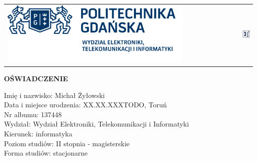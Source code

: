 \documentclass[10pt,a4paper,titlepage,twoside]{report}
\begin{document}
\begin{center}
\begin{tabular}{l l r}
 	\includegraphics[scale=0.26]{pics/pg_weti.png} & \hspace*{5cm} &  \includegraphics[width=0.13\textwidth]{pics/eti.png}\\  
\end{tabular} 
\end{center}

\vspace*{0.1cm}

\begin{flushleft} 
	\large{\bf{OŚWIADCZENIE}}\\
\end{flushleft}

\vspace*{0.1cm}

\begin{flushleft}

	Imię i nazwisko: Michał Żyłowski\\
	\vspace*{0.1cm}
	Data i miejsce urodzenia:  XX.XX.XXXTODO, Toruń\\
	\vspace*{0.1cm}
	Nr albumu: 137448\\
	\vspace*{0.1cm}
	Wydział: Wydział Elektroniki, Telekomunikacji i Informatyki\\
	\vspace*{0.1cm}
	Kierunek: informatyka\\
	\vspace*{0.1cm}	
	Poziom studiów: II stopnia - magisterskie\\
	\vspace*{0.1cm}	
	Forma studiów: stacjonarne\\

\end{flushleft}
\end{document}
